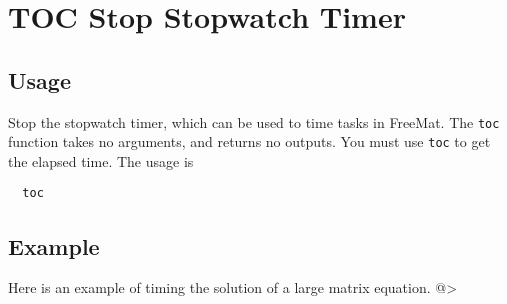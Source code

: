 \section{TOC Stop Stopwatch Timer}

\subsection{Usage}

Stop the stopwatch timer, which can be used to time tasks in FreeMat.
The \verb|toc| function takes no arguments, and returns no outputs.  You must use
\verb|toc| to get the elapsed time.  The usage is
\begin{verbatim}
  toc
\end{verbatim}
\subsection{Example}

Here is an example of timing the solution of a large matrix equation.
@>
